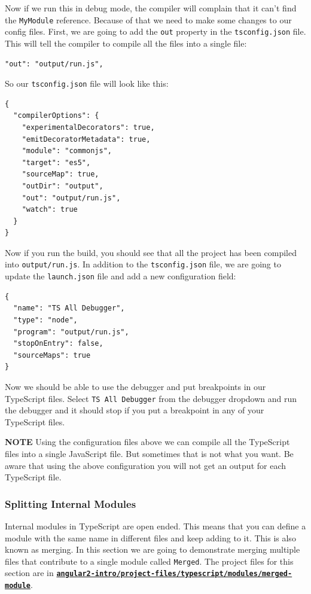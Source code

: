 \documentclass[12pt,]{article}
\begin{document}
Now if we run this in debug mode, the compiler will complain that it
can't find the \texttt{MyModule} reference. Because of that we need to
make some changes to our config files. First, we are going to add the
\texttt{out} property in the \texttt{tsconfig.json} file. This will tell
the compiler to compile all the files into a single file:

\begin{verbatim}
"out": "output/run.js",
\end{verbatim}

So our \texttt{tsconfig.json} file will look like this:

\begin{verbatim}
{
  "compilerOptions": {
    "experimentalDecorators": true,
    "emitDecoratorMetadata": true,
    "module": "commonjs",
    "target": "es5",
    "sourceMap": true,
    "outDir": "output",
    "out": "output/run.js",
    "watch": true
  }
}
\end{verbatim}

Now if you run the build, you should see that all the project has been
compiled into \texttt{output/run.js}. In addition to the
\texttt{tsconfig.json} file, we are going to update the
\texttt{launch.json} file and add a new configuration field:

\begin{verbatim}
{
  "name": "TS All Debugger",
  "type": "node",
  "program": "output/run.js",
  "stopOnEntry": false,
  "sourceMaps": true
}
\end{verbatim}

Now we should be able to use the debugger and put breakpoints in our
TypeScript files. Select \texttt{TS\ All\ Debugger} from the debugger
dropdown and run the debugger and it should stop if you put a breakpoint
in any of your TypeScript files.

\textbf{NOTE} Using the configuration files above we can compile all the
TypeScript files into a single JavaScript file. But sometimes that is
not what you want. Be aware that using the above configuration you will
not get an output for each TypeScript file.

\subsubsection{Splitting Internal
Modules}\label{splitting-internal-modules}

Internal modules in TypeScript are open ended. This means that you can
define a module with the same name in different files and keep adding to
it. This is also known as merging. In this section we are going to
demonstrate merging multiple files that contribute to a single module
called \texttt{Merged}. The project files for this section are in
\href{https://github.com/st32lth/angular2-intro/tree/master/project-files/typescript/modules/merged-module}{\textbf{\texttt{angular2-intro/project-files/typescript/modules/merged-module}}}.
\end{document}
